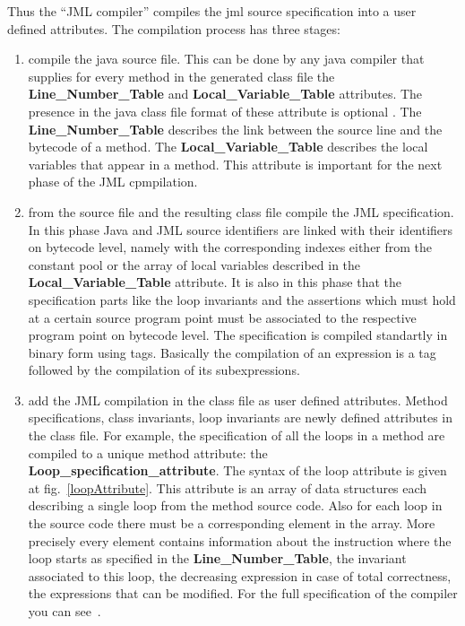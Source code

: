 Thus the ``JML compiler'' compiles the jml source specification into a user defined attributes. The compilation process has three stages:
\begin{enumerate}
\item compile the java source file. This can be done by any java compiler that supplies for every method in the generated class file the \textbf{Line\_Number\_Table} and \textbf{Local\_Variable\_Table}  attributes.
 The presence in the java class file format of these attribute is optional \cite{VMSpec}. The \textbf{Line\_Number\_Table} describes the link between the source line and the bytecode of a method.  The \textbf{Local\_Variable\_Table} describes the local variables that appear in a method. This attribute is important for the next phase of the JML cpmpilation.
\item from the source file and the resulting class file compile the JML specification. In this phase Java and JML source identifiers are linked with their identifiers on bytecode level, namely with the corresponding indexes either from the constant pool or the array of local variables described in the \textbf{Local\_Variable\_Table} attribute. It is also in this phase that the specification parts like the loop invariants and the assertions which must hold at a certain source program point must be associated to the respective program point on bytecode level. The specification
is compiled standartly in binary form using tags. Basically the compilation of an expression is a tag followed by the compilation of its subexpressions. 


\item add the JML compilation in the class file as user defined attributes. Method specifications, class invariants, loop invariants are 
newly defined attributes in the class file.
 For example, the specification of all the loops in a method are compiled to a unique method attribute: the \textbf{Loop\_specification\_attribute}. The syntax of the loop attribute is given at fig.~\ref{loopAttribute}. This attribute is an array of data structures each describing a single loop from the method source code. Also for each loop in the source code there must be a corresponding element in the array. 
More precisely every element contains information about the instruction where the loop starts as specified in the \textbf{Line\_Number\_Table}, the invariant associated to this loop, the decreasing expression in case of total correctness, the expressions that can be modified. 
For the full specification of the compiler you can see~\cite{JML2BCSpec}.
\end{enumerate}
